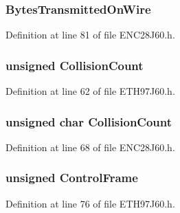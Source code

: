 \subsubsection[{Bytes\+Transmitted\+On\+Wire}]{ Bytes\+Transmitted\+On\+Wire}\label{union_t_x_s_t_a_t_u_s_aae7b9274a8d42addfebd0212e7fd7ea4}


Definition at line 81 of file E\+N\+C28\+J60.\+h.

\hypertarget{union_t_x_s_t_a_t_u_s_a2f47d9b2c620f8acf042b759b533edca}{}
\subsubsection[{Collision\+Count}]{\setlength{\rightskip}{0pt plus 5cm}unsigned Collision\+Count}\label{union_t_x_s_t_a_t_u_s_a2f47d9b2c620f8acf042b759b533edca}


Definition at line 62 of file E\+T\+H97\+J60.\+h.

\hypertarget{union_t_x_s_t_a_t_u_s_a859eaa4b288d0adc251d379fcd16be67}{}
\subsubsection[{Collision\+Count}]{\setlength{\rightskip}{0pt plus 5cm}unsigned char Collision\+Count}\label{union_t_x_s_t_a_t_u_s_a859eaa4b288d0adc251d379fcd16be67}


Definition at line 68 of file E\+N\+C28\+J60.\+h.

\hypertarget{union_t_x_s_t_a_t_u_s_a4c4b64b10bc5357f9b36b50c226d6cfe}{}
\subsubsection[{Control\+Frame}]{\setlength{\rightskip}{0pt plus 5cm}unsigned Control\+Frame}\label{union_t_x_s_t_a_t_u_s_a4c4b64b10bc5357f9b36b50c226d6cfe}


Definition at line 76 of file E\+T\+H97\+J60.\+h.


